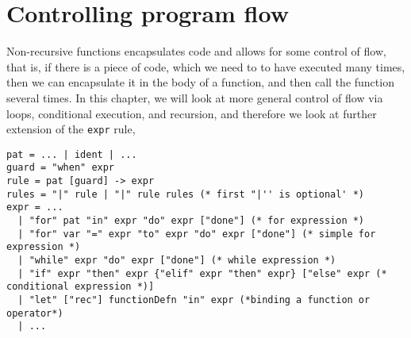 \chapter{Controlling program flow}
\label{chap:flow}
Non-recursive functions encapsulates code and allows for some control of flow, that is, if there is a piece of code, which we need to to have executed many times, then we can encapsulate it in the body of a function, and then call the function several times. In this chapter, we will look at more general control of flow via loops, conditional execution, and recursion, and therefore we look at further extension of the \lstinline[language=ebnf]!expr! rule,
\begin{lstlisting}[language=ebnf]
pat = ... | ident | ...
guard = "when" expr
rule = pat [guard] -> expr
rules = "|" rule | "|" rule rules (* first "|'' is optional' *)
expr = ... 
  | "for" pat "in" expr "do" expr ["done"] (* for expression *)
  | "for" var "=" expr "to" expr "do" expr ["done"] (* simple for expression *)
  | "while" expr "do" expr ["done"] (* while expression *)
  | "if" expr "then" expr {"elif" expr "then" expr} ["else" expr (*  conditional expression *)]
  | "let" ["rec"] functionDefn "in" expr (*binding a function or operator*)
  | ...
\end{lstlisting}

